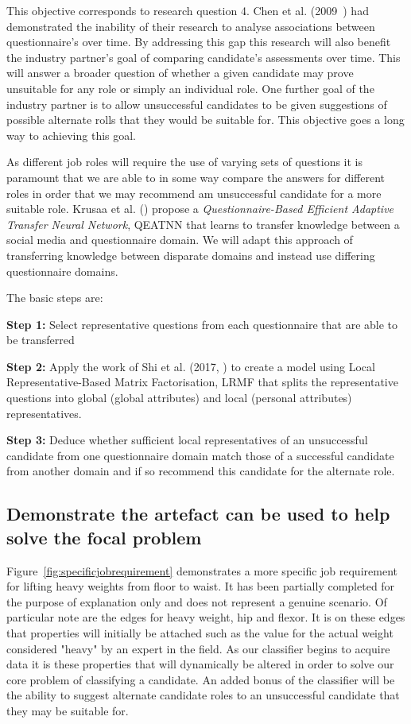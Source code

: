 This objective corresponds to research question 4. Chen et al. (2009~\cite{chen2009mining}) had demonstrated the inability of their research to analyse associations between questionnaire's over time. By addressing this gap this research will also benefit the industry partner's goal of comparing candidate's assessments over time. This will answer a broader question of whether a given candidate may prove unsuitable for any role or simply an individual role. One further goal of the industry partner is to allow unsuccessful candidates to be given suggestions of possible alternate rolls that they would be suitable for. This objective goes a long way to achieving this goal.

As different job roles will require the use of varying sets of questions it is paramount that we are able to in some way compare the answers for different roles in order that we may recommend am unsuccessful candidate for a more suitable role. Krusaa et al. (\cite{krusaatransfer}) propose a \textit{Questionnaire-Based Efficient Adaptive Transfer Neural Network}, QEATNN that learns to transfer knowledge between a social media and questionnaire domain. We will adapt this approach of transferring knowledge between disparate domains and instead use differing questionnaire domains.

The basic steps are:

\noindent
\textbf{Step 1:} Select representative questions from each questionnaire that are able to be transferred

\noindent
\textbf{Step 2:} Apply the work of Shi et al. (2017, \cite{shi2017local}) to create a model using Local Representative-Based
Matrix Factorisation, LRMF that splits the representative questions into global (global attributes) and local (personal attributes) representatives.

\noindent
\textbf{Step 3:} Deduce whether sufficient local representatives of an unsuccessful candidate from one questionnaire domain match those of a successful candidate from another domain and if so recommend this candidate for the alternate role.

\subsection{Demonstrate the artefact can be used to help solve the focal problem}

Figure~\ref{fig:specificjobrequirement} demonstrates a more specific job requirement for lifting heavy weights from floor
to waist. It has been partially completed for the purpose of explanation only and does not represent a genuine scenario.
Of particular note are the edges for heavy weight,
hip and flexor. It is on these edges that properties will initially be attached such as the value for the actual weight
considered "heavy" by an expert in the field. As our classifier begins to acquire data it is these properties that will
dynamically be altered in order to solve our core problem of classifying a candidate. An added bonus of the classifier
will be the ability to suggest alternate candidate roles to an unsuccessful candidate that they may be suitable for.

